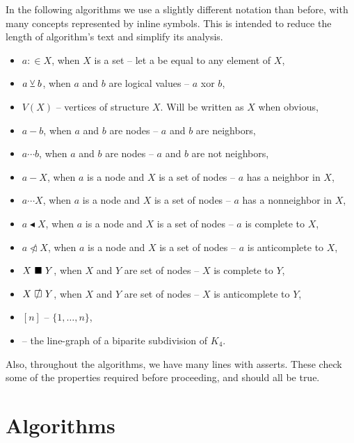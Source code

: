 In the following algorithms we use a slightly different notation than before, with many concepts represented by inline symbols. This is intended to reduce the length of algorithm's text and simplify its analysis.

\begin{itemize}
	\item $a :\in X$, when $X$ is a set -- let a be equal to any element of $X$,
	\item $a \veebar b$, when $a$ and $b$ are logical values -- $a$ xor $b$,
	\item $V(X)$ -- vertices of structure $X$. Will be written as $X$ when obvious,
	\item $a - b$, when $a$ and $b$ are nodes -- $a$ and $b$ are neighbors,
	\item $a \cdots b$, when $a$ and $b$ are nodes -- $a$ and $b$ are not neighbors,
	\item $a - X$, when $a$ is a node and $X$ is a set of nodes -- $a$ has a neighbor in $X$,
	\item $a \cdots X$, when $a$ is a node and $X$ is a set of nodes -- $a$ has a nonneighbor in $X$,
	\item $a \blacktriangleleft  X$, when $a$ is a node and $X$ is a set of nodes -- $a$ is complete to $X$,
	\item $a \ntriangleleft X$, when $a$ is a node and $X$ is a set of nodes -- $a$ is anticomplete to $X$,
	\item $X \ \blacksquare\  Y$, when $X$ and $Y$ are set of nodes -- $X$ is complete to $Y$,
	\item $X \setAntiComplete Y$, when $X$ and $Y$ are set of nodes -- $X$ is anticomplete to $Y$,
	\item $[n]$  -- $\{1, \ldots, n\}$,
	\item \LGBSK -- the line-graph of a biparite subdivision of $K_4$.
\end{itemize}

Also, throughout the algorithms, we have many lines with asserts. These check some of the properties required before proceeding, and should all be true.

\clearpage
\section{Algorithms}


\clearpage

\noindent
\clearpage

